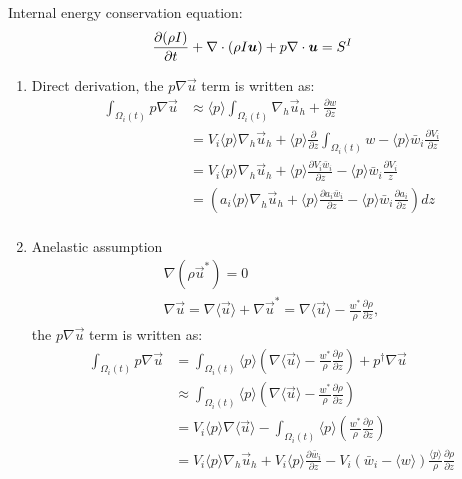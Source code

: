 \documentclass{report}
\begin{document}
\newpage
Internal energy conservation equation:
\begin{align*}
 & \frac{\partial (\rho I)}{\partial t} + \nabla \cdot \left(\rho I\boldsymbol{{u}} \right) + p\nabla\cdot \boldsymbol{{u}}
 = S^{I}
\end{align*}
\begin{enumerate}
\item Direct derivation, the $p \nabla \vec{u}$ term is written as:
\begin{align*}
\int_{\Omega_i(t)} p \nabla\vec{u} &\approx 
    \langle p\rangle \int_{\Omega_i(t)}  \nabla_h \vec{u}_h + \frac{\partial w}{\partial z}  \\
    &=
    V_i \langle p\rangle \nabla_h \vec{u}_h + \langle p\rangle \frac{\partial }{\partial z} \int_{\Omega_i(t)} w -  \langle p\rangle \bar{w}_i \frac{\partial V_i}{\partial z}  \\
    &=
    V_i \langle p\rangle \nabla_h \vec{u}_h + \langle p\rangle \frac{\partial V_i \bar{w}_i}{\partial z} -  \langle p\rangle \bar{w}_i \frac{\partial V_i}{z}  \\
     &=
    \left(a_i \langle p\rangle \nabla_h \vec{u}_h + \langle p\rangle \frac{\partial a_i \bar{w}_i}{\partial z} -  \langle p\rangle \bar{w}_i \frac{\partial a_i}{\partial z} \right) dz \\
\end{align*}

\item Anelastic assumption
\begin{align*}
    \nabla (\rho \vec{u}^{*}) = 0\\
    \nabla \vec{u} = \nabla \langle\vec{u}\rangle + \nabla \vec{u}^* = \nabla \langle\vec{u}\rangle - \frac{w^{*}}{\rho}\frac{\partial \rho}{\partial z},
\end{align*} 
the $p \nabla \vec{u}$ term is written as:
\begin{align*}
\int_{\Omega_i(t)} p \nabla\vec{u} &= 
    \int_{\Omega_i(t)} \langle p\rangle (\nabla \langle\vec{u}\rangle - \frac{w^{*}}{\rho}\frac{\partial \rho}{\partial z}) +  p^{\dagger}\nabla\vec{u}  \\
    &\approx
    \int_{\Omega_i(t)} \langle p\rangle (\nabla \langle\vec{u}\rangle - \frac{w^{*}}{\rho}\frac{\partial \rho}{\partial z}) \\
    &= V_i \langle p\rangle \nabla \langle\vec{u}\rangle   - \int_{\Omega_i(t)} \langle p\rangle  (  \frac{w^{*}}{\rho}\frac{\partial \rho}{\partial z})  \\
    &= V_i \langle p\rangle \nabla_h \vec{u}_h + V_i \langle p\rangle \frac{\partial \bar{w}_i}{\partial z} -  V_i \left(\bar{w}_i - \langle w \rangle\right) \frac{\langle p\rangle}{\rho}\frac{\partial \rho}{\partial z} \\
\end{align*}



\end{enumerate}
\end{document}
